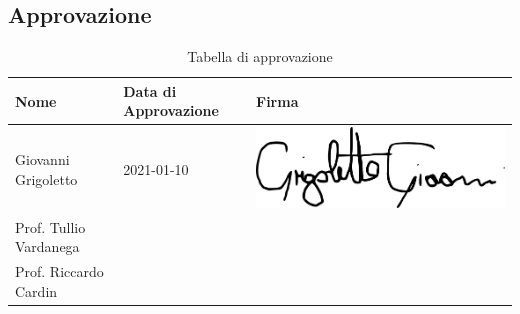 \subsection{Approvazione}
{
	\renewcommand{\arraystretch}{2}
	\centering
	\begin{longtable}{ C{5cm} C{3.4cm} C{5cm} }
		\caption{Tabella di approvazione}\\
		\rowcolor{\primaryColor}
        \textcolor{\secondaryColor}{\textbf{Nome}} & \textcolor{\secondaryColor}{\textbf{Data di Approvazione}} & \textcolor{\secondaryColor}{\textbf{Firma}}\\	\endhead
		{Giovanni Grigoletto} & 2021-01-10 & \includegraphics[scale=0.20]{./src/Organigramma/immagini/firme/giovanni.png}\\
		{Prof. Tullio Vardanega} &  &   \\
		{Prof. Riccardo Cardin} &  &   \\
	\end{longtable}
}

